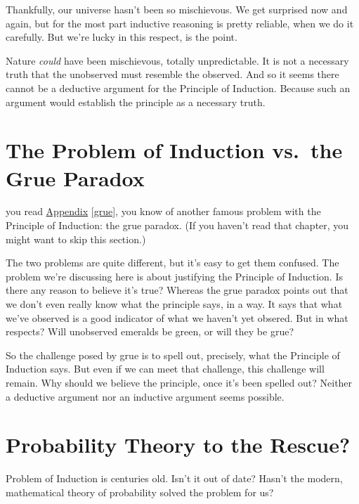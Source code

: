 \documentclass[justified]{tufte-book}
\theoremstyle{definition}
\theoremstyle{definition}
\theoremstyle{definition}
\theoremstyle{remark}
\begin{document}
Thankfully, our universe hasn't been so mischievous. We get surprised
now and again, but for the most part inductive reasoning is pretty
reliable, when we do it carefully. But we're lucky in this respect, is
the point.

Nature \emph{could} have been mischievous, totally unpredictable. It is
not a necessary truth that the unobserved must resemble the observed.
And so it seems there cannot be a deductive argument for the Principle
of Induction. Because such an argument would establish the principle as
a necessary truth.

\hypertarget{the-problem-of-induction-vs.the-grue-paradox}{%
\section*{The Problem of Induction vs.~the Grue
Paradox}\label{the-problem-of-induction-vs.the-grue-paradox}}

 you read \protect\hyperlink{grue}{Appendix} \ref{grue},
you know of another famous problem with the Principle of Induction: the
grue paradox. (If you haven't read that chapter, you might want to skip
this section.)

The two problems are quite different, but it's easy to get them
confused. The problem we're discussing here is about justifying the
Principle of Induction. Is there any reason to believe it's true?
Whereas the grue paradox points out that we don't even really know what
the principle says, in a way. It says that what we've observed is a good
indicator of what we haven't yet obsered. But in what respects? Will
unobserved emeralds be green, or will they be grue?

So the challenge posed by grue is to spell out, precisely, what the
Principle of Induction says. But even if we can meet that challenge,
this challenge will remain. Why should we believe the principle, once
it's been spelled out? Neither a deductive argument nor an inductive
argument seems possible.

\hypertarget{probability-theory-to-the-rescue}{%
\section*{Probability Theory to the
Rescue?}\label{probability-theory-to-the-rescue}}

 Problem of Induction is centuries old. Isn't it out of
date? Hasn't the modern, mathematical theory of probability solved the
problem for us?
\end{document}
